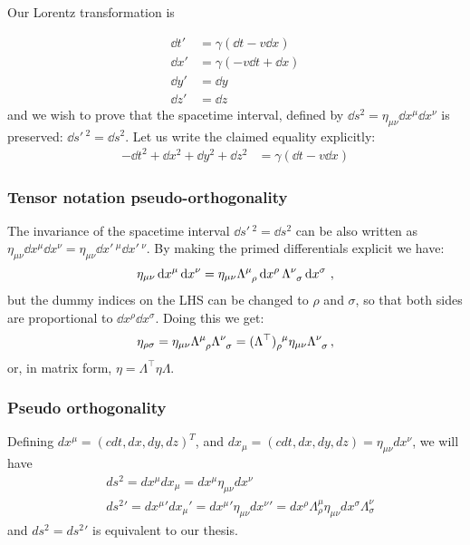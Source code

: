 \documentclass[main.tex]{subfiles}
\begin{document}
Our Lorentz transformation is 

\begin{subequations}
\begin{align}
    \dd{t}' &= \gamma (\dd{t} - v \dd{x}) \\
    \dd{x}' &= \gamma (-v\dd{t} + \dd{x}) \\
    \dd{y}' &= \dd{y} \\
    \dd{z}' &= \dd{z}
\end{align}
\end{subequations}
%
and we wish to prove that the spacetime interval, defined by $\dd{s^2} = \eta_{\mu\nu} \dd{x^\mu}\dd{x^\nu}$ is preserved: $\dd{s'\,^2} = \dd{s^2}$.
Let us write the claimed equality explicitly:
%
\begin{subequations}
\begin{align}
    -\dd{t^2} + \dd{x^2}+ \dd{y^2}+ \dd{z^2}
    &= \gamma (\dd{t} - v \dd{x})
\end{align}
\end{subequations}


\subsubsection{Tensor notation pseudo-orthogonality}

The invariance of the spacetime interval $\dd{s'\,^2} = \dd{s^2}$ can be also written as \(\eta_{\mu\nu} \dd{x^\mu} \dd{x^\nu} = \eta_{\mu\nu} \dd{x'\,^\mu} \dd{x'\,^\nu}\). By making the primed differentials explicit we have:
%
\begin{equation}
  \eta_{\mu\nu} \dd{x^\mu} \dd{x^\nu}
  =
  \eta_{\mu\nu} \tensor{\Lambda}{^\mu_\rho} \dd{x^\rho} \tensor{\Lambda}{^\nu_\sigma} \dd{x^\sigma} \,,
\end{equation}
%
but the dummy indices on the LHS can be changed to \(\rho\) and \(\sigma\), so that both sides are proportional to  \(\dd{x^\rho}\dd{x^\sigma}\). Doing this we get:
%
\begin{equation}
  \eta_{\rho\sigma}
  =
  \eta_{\mu\nu} \tensor{\Lambda}{^\mu_\rho} \tensor{\Lambda}{^\nu_\sigma}
  =\tensor{(\Lambda^\top)}{_\rho^\mu} \eta_{\mu\nu} \tensor{\Lambda}{^\nu_\sigma} \,,
\end{equation}
%
or, in matrix form, \(\eta = \Lambda^\top \eta \Lambda\).
\subsubsection{Pseudo orthogonality}
Defining $dx^\mu=(cdt,dx,dy,dz)^T$, and $dx_\mu=(cdt,dx,dy,dz)=\eta_{\mu\nu}dx^\nu$, we will have
\begin{align}
&ds^2=dx^\mu dx_\mu=dx^\mu\eta_{\mu\nu}dx^\nu\nonumber\\
&ds^2'=dx^\mu' dx_\mu'=dx^\mu'\eta_{\mu\nu}dx^\nu'=dx^\rho\Lambda_\rho^\mu\eta_{\mu\nu}dx^\sigma\Lambda_\sigma^\nu
\end{align} and $ds^2=ds^2'$ is equivalent to our thesis.
\end{document}
